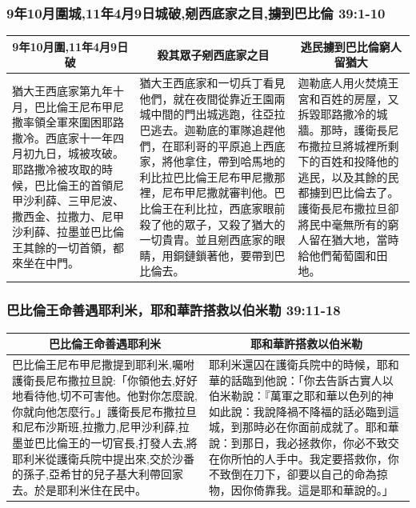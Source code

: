 \subsubsection{9年10月圍城,11年4月9日城破,剜西底家之目,擄到巴比倫 39:1-10}
\begin{table}[H]
\centering
\begin{tabular}{p{5.25cm}|p{7.0cm}|p{5.0cm}}\hline\hline
\multicolumn{1}{c|}{9年10月圍,11年4月9日破}&\multicolumn{1}{c|}{殺其眾子剜西底家之目}&\multicolumn{1}{c}{逃民擄到巴比倫窮人留猶大}\\\hline
猶大王西底家第九年十月，巴比倫王尼布甲尼撒率領全軍來圍困耶路撒冷。西底家十一年四月初九日，城被攻破。耶路撒冷被攻取的時候，巴比倫王的首領尼甲沙利薛、三甲尼波、撒西金、拉撒力、尼甲沙利薛、拉墨並巴比倫王其餘的一切首領，都來坐在中門。
&猶大王西底家和一切兵丁看見他們，就在夜間從靠近王園兩城中間的門出城逃跑，往亞拉巴逃去。迦勒底的軍隊追趕他們，在耶利哥的平原追上西底家，將他拿住，帶到哈馬地的利比拉巴比倫王尼布甲尼撒那裡，尼布甲尼撒就審判他。巴比倫王在利比拉，西底家眼前殺了他的眾子，又殺了猶大的一切貴胄。並且剜西底家的眼睛，用銅鏈鎖著他，要帶到巴比倫去。
&迦勒底人用火焚燒王宮和百姓的房屋，又拆毀耶路撒冷的城牆。那時，護衛長尼布撒拉旦將城裡所剩下的百姓和投降他的逃民，以及其餘的民都擄到巴比倫去了。護衛長尼布撒拉旦卻將民中毫無所有的窮人留在猶大地，當時給他們葡萄園和田地。\\\hline
\end{tabular}
\end{table}


\subsubsection{巴比倫王命善遇耶利米，耶和華許搭救以伯米勒 39:11-18}
\begin{table}[H]
\centering
\begin{tabular}{p{8.75cm}|p{9.0cm}}\hline\hline
\multicolumn{1}{c|}{巴比倫王命善遇耶利米}&\multicolumn{1}{c}{耶和華許搭救以伯米勒}\\\hline
巴比倫王尼布甲尼撒提到耶利米,囑咐護衛長尼布撒拉旦說:「你領他去,好好地看待他,切不可害他。他對你怎麼說,你就向他怎麼行。」護衛長尼布撒拉旦和尼布沙斯班,拉撒力,尼甲沙利薛,拉墨並巴比倫王的一切官長,打發人去,將耶利米從護衛兵院中提出來,交於沙番的孫子,亞希甘的兒子基大利帶回家去。於是耶利米住在民中。
&耶利米還囚在護衛兵院中的時候，耶和華的話臨到他說：「你去告訴古實人以伯米勒說：『萬軍之耶和華以色列的神如此說：我說降禍不降福的話必臨到這城，到那時必在你面前成就了。耶和華說：到那日，我必拯救你，你必不致交在你所怕的人手中。我定要搭救你，你不致倒在刀下，卻要以自己的命為掠物，因你倚靠我。這是耶和華說的。」\\\hline
\end{tabular}
\end{table}



